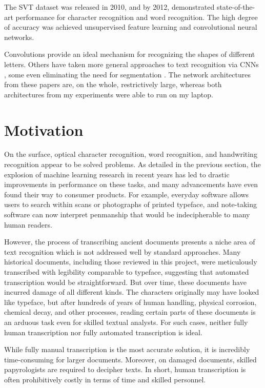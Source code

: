 \documentclass[final]{ukthesis}
\begin{document}
The SVT dataset was released in 2010, and by 2012, \cite{wang2012end} demonstrated state-of-the-art performance for character recognition and word recognition. The high degree of accuracy was achieved unsupervised feature learning and convolutional neural networks.


Convolutions provide an ideal mechanism for recognizing the shapes of different letters. Others have taken more general approaches to text recognition via CNNs \cite{wang2012end,jaderberg2016reading}, some even eliminating the need for segmentation \cite{rusinol2015efficient}. The network architectures from these papers are, on the whole, restrictively large, whereas both architectures from my experiments were able to run on my laptop.





\section{Motivation}
On the surface, optical character recognition, word recognition, and handwriting recognition appear to be solved problems. As detailed in the previous section, the explosion of machine learning research in recent years has led to drastic improvements in performance on these tasks, and many advancements have even found their way to consumer products. For example, everyday software allows users to search within scans or photographs of printed typeface, and note-taking software can now interpret penmanship that would be indecipherable to many human readers.

However, the process of transcribing ancient documents presents a niche area of text recognition which is not addressed well by standard approaches. Many historical documents, including those reviewed in this project, were meticulously transcribed with legibility comparable to typeface, suggesting that automated transcription would be straightforward. But over time, these documents have incurred damage of all different kinds. The characters originally may have looked like typeface, but after hundreds of years of human handling, physical corrosion, chemical decay, and other processes, reading certain parts of these documents is an arduous task even for skilled textual analysts. For such cases, neither fully human transcription nor fully automated transcription is ideal.

While fully manual transcription is the most accurate solution, it is incredibly time-consuming for larger documents. Moreover, on damaged documents, skilled papyrologists are required to decipher texts. In short, human transcription is often prohibitively costly in terms of time and skilled personnel.
\end{document}
